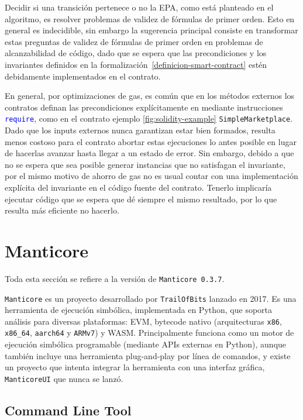 Decidir si una transición pertenece o no la EPA, como está planteado en el algoritmo, es resolver problemas de validez de fórmulas de primer orden.
Esto en general es indecidible, sin embargo la sugerencia principal consiste en transformar estas preguntas de validez de fórmulas de primer orden en problemas de alcanzabilidad de código, dado que se espera que las precondiciones y los invariantes definidos en la formalización~\ref{definicion-smart-contract} estén debidamente implementados en el contrato.

En general, por optimizaciones de gas, es común que en los métodos externos los contratos definan las precondiciones explícitamente en mediante instrucciones \textcolor{blue}{\texttt{require}}, como en el contrato ejemplo \ref{fig:solidity-example} \texttt{SimpleMarketplace}.
Dado que los inputs externos nunca garantizan estar bien formados, resulta menos costoso para el contrato abortar estas ejecuciones lo antes posible en lugar de hacerlas avanzar hasta llegar a un estado de error.
Sin embargo, debido a que no se espera que sea posible generar instancias que no satisfagan el invariante, por el mismo motivo de ahorro de gas no es usual contar con una implementación explícita del invariante en el código fuente del contrato.
Tenerlo implicaría ejecutar código que se espera que dé siempre el mismo resultado, por lo que resulta más eficiente no hacerlo.

\section{Manticore}

Toda esta sección se refiere a la versión de \texttt{Manticore 0.3.7}.

\texttt{Manticore} es un proyecto desarrollado por \texttt{TrailOfBits} lanzado en 2017.
Es una herramienta de ejecución simbólica, implementada en Python, que soporta análisis para diversas plataformas: EVM, bytecode nativo (arquitecturas \texttt{x86}, \texttt{x86\_64}, \texttt{aarch64} y \texttt{ARMv7}) y WASM.
Principalmente funciona como un motor de ejecución simbólica programable (mediante APIs externas en Python), aunque también incluye una herramienta plug-and-play por línea de comandos, y existe un proyecto que intenta integrar la herramienta con una interfaz gráfica, \texttt{ManticoreUI} \cite{manticoreUI} que nunca se lanzó.

\subsection{Command Line Tool}

